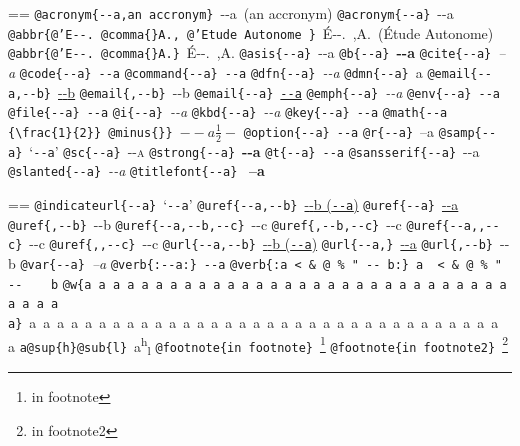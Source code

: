 \documentclass{book}
\makeatletter
\newcommand\Texinfocommandstyletextcite[1]{{\normalfont{}\textsl{#1}}}%
\newcommand\Texinfocommandstyletextkbd[1]{{\ttfamily\textsl{#1}}}%
\newcommand\Texinfocommandstyletextvar[1]{{\normalfont{}\textsl{#1}}}%
\newenvironment{Texinfopreformatted}{%
  \par\GNUTobeylines\obeyspaces\frenchspacing\parskip=\z@\parindent=\z@}{}
{\catcode`\^^M=13 \gdef\GNUTobeylines{\catcode`\^^M=13 \def^^M{\null\par}}}
\newenvironment{Texinfoindented}{\begin{list}{}{}\item\relax}{\end{list}}
\renewcommand{\_}{\Texinfounderscore\discretionary{}{}{}}
\makeatother
\begin{document}
{{\begin{Texinfoindented}
\begin{Texinfopreformatted}
\texttt{@acronym\{{-}{-}a,an accronym\}}\ {-}{-}a\ (an accronym)
\texttt{@acronym\{{-}{-}a\}}\ {-}{-}a
\texttt{@abbr\{@'E{-}{-}.\ @comma\{\}A.,\ @'Etude Autonome \}}\ \'{E}{-}{-}.\@\ ,A.\@\ (\'{E}tude Autonome)
\texttt{@abbr\{@'E{-}{-}.\ @comma\{\}A.\}}\ \'{E}{-}{-}.\@\ ,A.\@
\texttt{@asis\{{-}{-}a\}}\ {-}{-}a
\texttt{@b\{{-}{-}a\}}\ \textbf{{-}{-}a}
\texttt{@cite\{{-}{-}a\}}\ \Texinfocommandstyletextcite{--a}
\texttt{@code\{{-}{-}a\}}\ \texttt{{-}{-}a}
\texttt{@command\{{-}{-}a\}}\ \texttt{{-}{-}a}
\texttt{@dfn\{{-}{-}a\}}\ \textsl{{-}{-}a}
\texttt{@dmn\{{-}{-}a\}}\ \thinspace {-}{-}a
\texttt{@email\{{-}{-}a,{-}{-}b\}}\ \href{mailto:--a}{{-}{-}b}
\texttt{@email\{,{-}{-}b\}}\ {-}{-}b
\texttt{@email\{{-}{-}a\}}\ \href{mailto:--a}{\nolinkurl{--a}}
\texttt{@emph\{{-}{-}a\}}\ \emph{{-}{-}a}
\texttt{@env\{{-}{-}a\}}\ \texttt{{-}{-}a}
\texttt{@file\{{-}{-}a\}}\ \texttt{{-}{-}a}
\texttt{@i\{{-}{-}a\}}\ \textit{{-}{-}a}
\texttt{@kbd\{{-}{-}a\}}\ \Texinfocommandstyletextkbd{{-}{-}a}
\texttt{@key\{{-}{-}a\}}\ \texttt{{-}{-}a}
\texttt{@math\{{-}{-}a \{\textbackslash{}frac\{1\}\{2\}\}\ @minus\{\}\}}\ $--a {\frac{1}{2}} -$
\texttt{@option\{{-}{-}a\}}\ \texttt{{-}{-}a}
\texttt{@r\{{-}{-}a\}}\ \textnormal{--a}
\texttt{@samp\{{-}{-}a\}}\ `\texttt{{-}{-}a}'
\texttt{@sc\{{-}{-}a\}}\ \textsc{{-}{-}a}
\texttt{@strong\{{-}{-}a\}}\ \textbf{{-}{-}a}
\texttt{@t\{{-}{-}a\}}\ \texttt{{-}{-}a}
\texttt{@sansserif\{{-}{-}a\}}\ \textsf{{-}{-}a}
\texttt{@slanted\{{-}{-}a\}}\ \textsl{{-}{-}a}
\texttt{@titlefont\{{-}{-}a\}}\ \end{Texinfopreformatted}
{\huge \bfseries --a}\begin{Texinfopreformatted}%
\ttfamily 
\texttt{@indicateurl\{{-}{-}a\}}\ `\texttt{{-}{-}a}'
\texttt{@uref\{{-}{-}a,{-}{-}b\}}\ \href{--a}{{-}{-}b (\nolinkurl{--a})}
\texttt{@uref\{{-}{-}a\}}\ \url{--a}
\texttt{@uref\{,{-}{-}b\}}\ {-}{-}b
\texttt{@uref\{{-}{-}a,{-}{-}b,{-}{-}c\}}\ {-}{-}c
\texttt{@uref\{,{-}{-}b,{-}{-}c\}}\ {-}{-}c
\texttt{@uref\{{-}{-}a{,}{,}{-}{-}c\}}\ {-}{-}c
\texttt{@uref\{{,}{,}{-}{-}c\}}\ {-}{-}c
\texttt{@url\{{-}{-}a,{-}{-}b\}}\ \href{--a}{{-}{-}b (\nolinkurl{--a})}
\texttt{@url\{{-}{-}a,\}}\ \url{--a}
\texttt{@url\{,{-}{-}b\}}\ {-}{-}b
\texttt{@var\{{-}{-}a\}}\ \Texinfocommandstyletextvar{--a}
\texttt{@verb\{:{-}{-}a:\}}\ \verb:--a:
\texttt{@verb\{:a  < \& @\ \% " {-}{-}    b:\}}\ \verb:a  < & @ % " --    b:
\texttt{@w\{a a a a a a a a a a a a a a a a a a a a a a a a a a a a a a a a a a a\}}\ \hbox{a a a a a a a a a a a a a a a a a a a a a a a a a a a a a a a a a a a}
\texttt{a@sup\{h\}@sub\{l\}}\ a\textsuperscript{h}\textsubscript{l}
\texttt{@footnote\{in footnote\}}\ \footnote{in footnote}
\texttt{@footnote\{in footnote2\}}\ \footnote{in footnote2}


\end{Texinfopreformatted}
\end{Texinfoindented}}}
\end{document}
